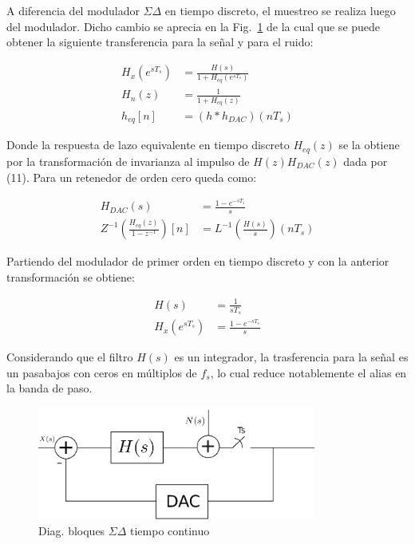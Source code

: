 \documentclass[a4paper,conference]{IEEEtran}
\begin{document}
A diferencia del modulador $\Sigma\Delta$ en tiempo discreto, el muestreo se realiza luego del modulador. Dicho cambio se aprecia en la Fig.~\ref{fig:SDTC} de la cual que se puede obtener la siguiente transferencia para la señal y para el ruido:


\begin{align}
H_x(e^{sT_s}) &= \frac{H(s)}{1+H_{eq}(e^{sT_s})} \\
H_n(z) &= \frac{1}{1+H_{eq}(z)} \\
h_{eq}[n] &= (h\ast h_{DAC})(nT_s)
\end{align}

Donde la respuesta de lazo equivalente en tiempo discreto $H_{eq}(z)$ se la obtiene por la transformaci\'on de invarianza al impulso\cite{DSP:Pro-Man} de $H(z)H_{DAC}(z)$ dada por (11). Para un retenedor de orden cero queda como:

\begin{align}
 H_{DAC}(s)&=\frac{1-e^{-sT_s}}{s}\\
 Z^{-1}(\frac{H_{eq}(z)}{1-z^{-1}})[n]&=L^{-1}(\frac{H(s)}{s})(nT_s)
\end{align}

Partiendo del modulador de primer orden en tiempo discreto y con la anterior transformaci\'on se obtiene:

\begin{align}
 H(s)&=\frac{1}{sT_s}\\
 H_x(e^{sT_s})&= \frac{1-e^{-sT_s}}{s}
\end{align}

Considerando que el filtro $H(s)$ es un integrador, la trasferencia para la se\~nal es un pasabajos con ceros en múltiplos de $f_s$, lo cual reduce notablemente el alias en la banda de paso.

\begin{figure}[!t]
\centering
\includegraphics[width=3.6in]{Sigma-Delta_Tiempo_Continuo}
\caption{Diag. bloques $\Sigma\Delta$ tiempo continuo}
\label{fig:SDTC}
\end{figure}
\end{document}
